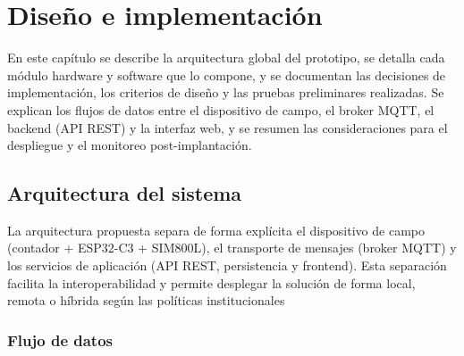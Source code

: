 \chapter{Diseño e implementación} %

\label{Chapter3}

En este capítulo se describe la arquitectura global del prototipo, se detalla cada módulo hardware y software que lo compone, y se documentan las decisiones de implementación, los criterios de diseño y las pruebas preliminares realizadas. Se explican los flujos de datos entre el dispositivo de campo, el broker MQTT, el backend (API REST) y la interfaz web, y se resumen las consideraciones para el despliegue y el monitoreo post-implantación.


\section{Arquitectura del sistema}

La arquitectura propuesta separa de forma explícita el dispositivo de campo (contador + ESP32-C3 + SIM800L), el transporte de mensajes (broker MQTT) y los servicios de aplicación (API REST, persistencia y frontend). Esta separación facilita la interoperabilidad y permite desplegar la solución de forma local, remota o híbrida según las políticas institucionales


\subsection{Flujo de datos} 

